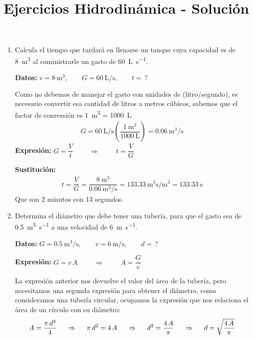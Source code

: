 \documentclass[14pt]{extarticle}
\title{\vspace*{-2cm} Ejercicios Hidrodinámica - Solución\vspace{-5ex}}
\date{}
\begin{document}
\maketitle

\begin{enumerate}
\item Calcula el tiempo que tardará en llenarse un tanque cuya capacidad es de \SI{8}{\cubic\meter} al suministrarle un gasto de \SI{60}{\liter\per\second}.

\textbf{Datos:} $ v = \SI{8}{\cubic\meter}, \quad \quad G = \SI{60}{\liter\per\second}, \quad \quad t = \, ?$

Como no debemos de manejar el gasto con unidades de (litro/segundo), es necesario convertir esa cantidad de litros a metros cúbicos, sabemos que el factor de conversión es \SI{1}{\cubic\meter} = \SI{1000}{\liter}
\begin{align*}
G = \SI[per-mode=fraction]{60}{\liter\per\second} \left( \dfrac{\SI{1}{\cubic\meter}}{\SI{1000}{\liter}} \right) = \SI[per-mode=fraction]{0.06}{\cubic\meter\per\second}
\end{align*}
\textbf{Expresión:} $G = \dfrac{V}{t} \hspace{1cm} \Rightarrow \hspace{1cm} t = \dfrac{V}{G}$

\textbf{Sustitución:}
\begin{align*}
t = \dfrac{V}{G} = \dfrac{\SI{8}{\cubic\meter}}{\displaystyle \SI[per-mode=fraction]{0.06}{\cubic\meter\per\second}} = \SI[per-mode=fraction]{133.33}{\cubic\meter\second\per\cubic\meter} = \SI{133.33}{\second}
\end{align*}
Que son 2 minutos con 13 segundos.
\item Determina el diámetro que debe tener una tubería, para que el gasto sea de \SI{0.5}{\cubic\meter\per\second} a una velocidad de \SI{6}{\meter\per\second}.

\textbf{Datos:} $G = \SI{0.5}{\cubic\meter\per\second}, \quad \quad v = \SI{6}{\meter\per\second}, \quad \quad d = \, ?$

\textbf{Expresión:} $G = v \, A \hspace{1cm} \Rightarrow \hspace{1cm} A = \dfrac{G}{v}$

La expresión anterior nos devuelve el valor del área de la tubería, pero necesitamos una segunda expresión para obtener el diámetro, como consideramos una tubería circular, ocupamos la expresión que nos relaciona el área de un círculo con su diámetro:
\begin{align*}
A = \dfrac{\pi \, d^{2}}{4} \hspace{0.5cm} \Rightarrow \hspace{0.5cm} \pi \, d^{2} = 4 \, A \hspace{0.5cm} \Rightarrow \hspace{0.5cm} d^{2} = \dfrac{4 \, A}{\pi} \hspace{0.5cm} \Rightarrow \hspace{0.5cm} d = \sqrt{ \dfrac{4 \, A}{\pi}}
\end{align*}


\end{enumerate}
\end{document}
